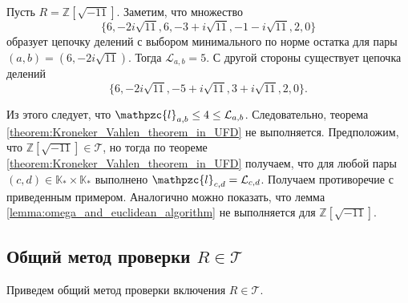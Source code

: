 \documentclass[_00_dissertation.tex]{subfiles}
\begin{document}
\begin{example}\label{example:Z[sqrt{-11}]}
    Пусть $R = \mathbb{Z}[\sqrt{-11}]$.
    Заметим, что множество
    \begin{equation*}
        \{6,-2i\sqrt{11},6,-3+i\sqrt{11},-1-i\sqrt{11},2,0\}
    \end{equation*}
    образует цепочку делений с выбором минимального по норме остатка для пары $(a,b)=(6,-2i\sqrt{11})$.
    Тогда $\mathcal{L}_{a,b}=5$.
    С другой стороны существует цепочка делений
    \begin{equation*}
        \{6,-2i\sqrt{11},-5+i\sqrt{11},3+i\sqrt{11},2,0\}.
    \end{equation*}
    
    Из этого следует, что $\mathpzc{l}_{a,b}\le 4\le \mathcal{L}_{a,b}$.
    Следовательно, теорема \ref{theorem:Kroneker_Vahlen_theorem_in_UFD} не выполняется.
    Предположим, что $\mathbb{Z}[\sqrt{-11}]\in\mathcal{T}$, но тогда по теореме \ref{theorem:Kroneker_Vahlen_theorem_in_UFD} получаем, что для любой пары $(c,d)\in\mathbb{K}_* \times\mathbb{K}_*$ выполнено $\mathpzc{l}_{c,d}=\mathcal{L}_{c,d}$.
    Получаем противоречие с приведенным примером.
    Аналогично можно показать, что лемма \ref{lemma:omega_and_euclidean_algorithm} не выполняется для $\mathbb{Z}[\sqrt{-11}].$
\end{example}

\subsection{Общий метод проверки $R \in \mathcal{T}$}

Приведем общий метод проверки включения $R \in \mathcal{T}$.
\end{document}
